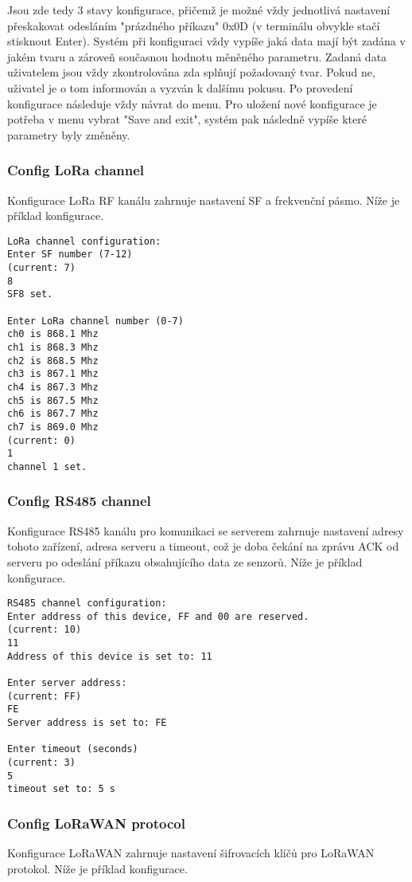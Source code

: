 Jsou zde tedy 3 stavy konfigurace, přičemž je možné vždy jednotlivá nastavení přeskakovat odesláním "prázdného příkazu" 0x0D (v terminálu obvykle stačí stisknout Enter). Systém při konfiguraci vždy vypíše jaká data mají být zadána v jakém tvaru a zároveň současnou hodnotu měněného parametru. Zadaná data uživatelem jsou vždy zkontrolována zda splňují požadovaný tvar. Pokud ne, uživatel je o tom informován a vyzván k dalšímu pokusu.
Po provedení konfigurace následuje vždy návrat do menu. Pro uložení nové konfigurace je potřeba v menu vybrat "Save and exit", systém pak následně vypíše které parametry byly změněny.

\subsubsection{Config LoRa channel}
Konfigurace LoRa RF kanálu zahrnuje nastavení SF a frekvenční pásmo. Níže je příklad konfigurace.

\begin{lstlisting}
LoRa channel configuration:
Enter SF number (7-12)
(current: 7)
8
SF8 set.

Enter LoRa channel number (0-7)
ch0 is 868.1 Mhz
ch1 is 868.3 Mhz
ch2 is 868.5 Mhz
ch3 is 867.1 Mhz
ch4 is 867.3 Mhz
ch5 is 867.5 Mhz
ch6 is 867.7 Mhz
ch7 is 869.0 Mhz
(current: 0)
1
channel 1 set.
\end{lstlisting}


\subsubsection{Config RS485 channel}
Konfigurace RS485 kanálu pro komunikaci se serverem zahrnuje nastavení adresy tohoto zařízení, adresa serveru a timeout, což je doba čekání na zprávu ACK od serveru po odeslání příkazu obsahujícího data ze senzorů. Níže je příklad konfigurace.

\begin{lstlisting}
RS485 channel configuration:
Enter address of this device, FF and 00 are reserved.
(current: 10)
11
Address of this device is set to: 11

Enter server address: 
(current: FF)
FE
Server address is set to: FE

Enter timeout (seconds)
(current: 3)
5
timeout set to: 5 s
\end{lstlisting}


\subsubsection{Config LoRaWAN protocol}
Konfigurace LoRaWAN zahrnuje nastavení šifrovacích klíčů pro LoRaWAN protokol. Níže je příklad konfigurace.

